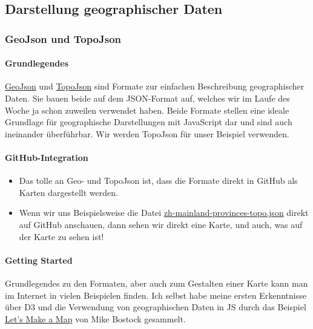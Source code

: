 
\subsection{\texorpdfstring{{Darstellung geographischer
Daten}}{Darstellung geographischer Daten}}

\subsubsection{\texorpdfstring{{GeoJson und
TopoJson}}{GeoJson und TopoJson}}

\paragraph{Grundlegendes}

\href{http://geojson.org}{GeoJson} und
\href{https://github.com/mbostock/topojson}{TopoJson} sind Formate zur
einfachen Beschreibung geographischer Daten. Sie bauen beide auf dem
JSON-Format auf, welches wir im Laufe des Woche ja schon zuweilen
verwendet haben. Beide Formate stellen eine ideale Grundlage für
geographische Darstellungen mit JavaScript dar und sind auch ineinander
überführbar. Wir werden TopoJson für unser Beispiel verwenden.



\paragraph{GitHub-Integration}

\begin{itemize}
\item
  Das tolle an Geo- und TopoJson ist, dass die Formate direkt in GitHub
  als Karten dargestellt werden.
\item
  Wenn wir uns Beispielsweise die Datei
  \href{https://github.com/LinguList/pyjs-seminar/blob/master/website/demos/china/maps/zh-mainland-provinces.topo.json}{zh-mainland-provinces-topo.json}
  direkt auf GitHub anschauen, dann sehen wir direkt eine Karte, und
  auch, was auf der Karte zu sehen ist!
\end{itemize}


\paragraph{Getting Started}

Grundlegendes zu den Formaten, aber auch zum Gestalten einer Karte kann
man im Internet in vielen Beispielen finden. Ich selbst habe meine
ersten Erkenntnisse über D3 und die Verwendung von geographischen Daten
in JS durch das Beispiel \href{http://bost.ocks.org/mike/map/}{Let's
Make a Map} von Mike Bostock gesammelt.

